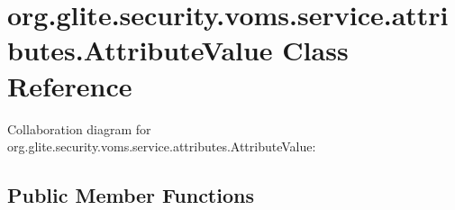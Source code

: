 \hypertarget{classorg_1_1glite_1_1security_1_1voms_1_1service_1_1attributes_1_1AttributeValue}{
\section{org.glite.security.voms.service.attributes.AttributeValue Class Reference}
\label{classorg_1_1glite_1_1security_1_1voms_1_1service_1_1attributes_1_1AttributeValue}
}


Collaboration diagram for org.glite.security.voms.service.attributes.AttributeValue:
\subsection*{Public Member Functions}
